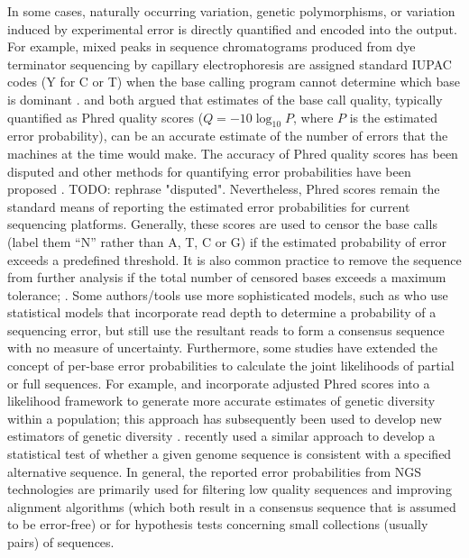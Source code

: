 \documentclass[10pt]{article}
\begin{document}
In some cases, naturally occurring variation, \ie genetic polymorphisms, or variation induced by experimental error is directly quantified and encoded into the output.
For example, mixed peaks in sequence chromatograms produced from dye terminator sequencing by capillary electrophoresis are assigned standard IUPAC codes (\eg Y for C or T) when the base calling program cannot determine which base is dominant \citep{NomenclatureIncompletelySpecified1986}.
\citet{ewingBaseCallingAutomatedSequencer1998} and \citet{richterichEstimationErrorsRaw1998} both argued that estimates of the base call quality, typically quantified as Phred quality scores ($Q=-10 \log_{10} P$, where $P$ is the estimated error probability), can be an accurate estimate of the number of errors that the machines at the time would make.
The accuracy of Phred quality scores has been disputed and other methods for quantifying error probabilities have been proposed \citep{liAdjustQualityScores2004, depristoFrameworkVariationDiscovery2011, liSNPDetectionMassively2009}. TODO: rephrase "disputed".
Nevertheless, Phred scores remain the standard means of reporting the estimated error probabilities for current sequencing platforms.
Generally, these scores are used to censor the base calls (\ie label them ``N'' rather than A, T, C or G) if the estimated probability of error exceeds a predefined threshold.
It is also common practice to remove the sequence from further analysis if the total number of censored bases exceeds a maximum tolerance; \eg \citet{doroninaPhylogeneticPositionEmended2005, robaskyRoleReplicatesError2014,oraweAccountingUncertaintyDNA2015}.
Some authors/tools use more sophisticated models, such as \citet{wuEstimatingErrorModels2017} who use statistical models that incorporate read depth to determine a probability of a sequencing error, but still use the resultant reads to form a consensus sequence with no measure of uncertainty.
Furthermore, some studies have extended the concept of per-base error probabilities to calculate the joint likelihoods of partial or full sequences.
For example, \citet{depristoFrameworkVariationDiscovery2011} and \citet{gompertHierarchicalBayesianModel2011} incorporate adjusted Phred scores into a likelihood framework to generate more accurate estimates of genetic diversity within a population; this approach has subsequently been used to develop new estimators of genetic diversity \citep{fumagalliQuantifyingPopulationGenetic2013a}. 
\citet{kuoEAGLEExplicitAlternative2018} recently used a similar approach to develop a statistical test of whether a given genome sequence is consistent with a specified alternative sequence.
In general, the reported error probabilities from NGS technologies are primarily used for filtering low quality sequences and improving alignment algorithms (which both result in a consensus sequence that is assumed to be error-free) or for hypothesis tests concerning small collections (usually pairs) of sequences.
\end{document}
